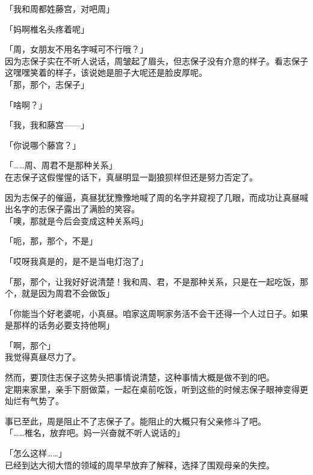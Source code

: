 「我和周都姓藤宫，对吧周」

「妈啊椎名头疼着呢」

「周，女朋友不用名字喊可不行哦？」\\

因为志保子实在不听人说话，周皱起了眉头，但志保子没有介意的样子。看志保子这嘿嘿笑着的样子，该说她是胆子大呢还是脸皮厚呢。\\

「那，那个，志保子」

「啥啊？」

「我，我和藤宫——」

「你说哪个藤宫？」

「……周、周君不是那种关系」\\

在志保子这假惺惺的话下，真昼明显一副狼狈样但还是努力否定了。

因为志保子的催逼，真昼犹犹豫豫地喊了周的名字并窥视了几眼，而成功让真昼喊出名字的志保子露出了满脸的笑容。\\

「噢，那就是今后会变成这种关系吗」

「呃，那，那个，不是」

「哎呀我真是的，是不是当电灯泡了」

「那，那个，让我好好说清楚！我和周、君，不是那种关系，只是在一起吃饭，那个，就是因为周君不会做饭」

「你能当个好老婆呢，小真昼。咱家这周啊家务活不会干还得一个人过日子。如果是那样的话务必要支持他啊」

「啊，那个」\\

我觉得真昼尽力了。

然而，要顶住志保子这势头把事情说清楚，这种事情大概是做不到的吧。\\

定期来家里，亲手下厨做菜，一起在桌前吃饭，听到这些的时候志保子眼神变得更灿烂有气势了。

事已至此，周是阻止不了志保子了。能阻止的大概只有父亲修斗了吧。\\

「……椎名，放弃吧。妈一兴奋就不听人说话的」

「怎么这样……」\\

已经到达大彻大悟的领域的周早早放弃了解释，选择了围观母亲的失控。
